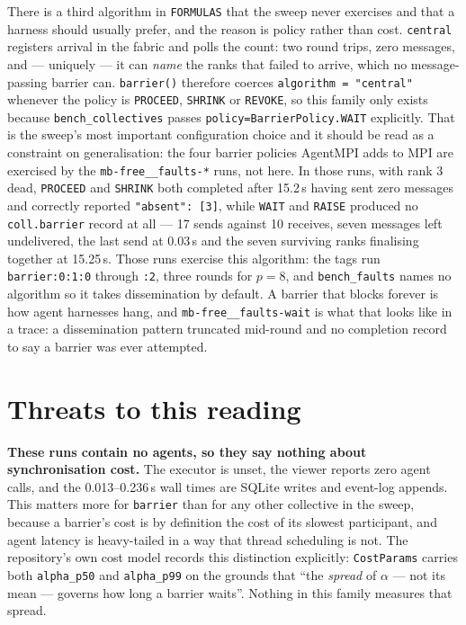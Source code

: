 \documentclass[11pt]{article}
\begin{document}
There is a third algorithm in \texttt{FORMULAS} that the sweep never exercises and that a
harness should usually prefer, and the reason is policy rather than cost. \texttt{central}
registers arrival in the fabric and polls the count: two round trips, zero messages, and ---
uniquely --- it can \emph{name} the ranks that failed to arrive, which no message-passing
barrier can. \texttt{barrier()} therefore coerces \texttt{algorithm = "central"} whenever the
policy is \texttt{PROCEED}, \texttt{SHRINK} or \texttt{REVOKE}, so this family only exists
because \texttt{bench\_collectives} passes \texttt{policy=BarrierPolicy.WAIT} explicitly. That
is the sweep's most important configuration choice and it should be read as a constraint on
generalisation: the four barrier policies AgentMPI adds to MPI are exercised by the
\texttt{mb-free\_\_faults-*} runs, not here. In those runs, with rank 3 dead, \texttt{PROCEED}
and \texttt{SHRINK} both completed after 15.2\,s having sent zero messages and correctly
reported \texttt{"absent": [3]}, while \texttt{WAIT} and \texttt{RAISE} produced no
\texttt{coll.barrier} record at all --- 17 sends against 10 receives, seven messages left
undelivered, the last send at 0.03\,s and the seven surviving ranks finalising together at
15.25\,s. Those runs exercise this algorithm: the tags run \texttt{barrier:0:1:0} through
\texttt{:2}, three rounds for $p=8$, and \texttt{bench\_faults} names no algorithm so it takes
dissemination by default. A barrier that blocks forever is how agent harnesses hang, and
\texttt{mb-free\_\_faults-wait} is what that looks like in a trace: a dissemination pattern
truncated mid-round and no completion record to say a barrier was ever attempted.

\section{Threats to this reading}

\textbf{These runs contain no agents, so they say nothing about synchronisation cost.} The
executor is unset, the viewer reports zero agent calls, and the 0.013--0.236\,s wall times are
SQLite writes and event-log appends. This matters more for \texttt{barrier} than for any other
collective in the sweep, because a barrier's cost is by definition the cost of its slowest
participant, and agent latency is heavy-tailed in a way that thread scheduling is not. The
repository's own cost model records this distinction explicitly: \texttt{CostParams} carries
both \texttt{alpha\_p50} and \texttt{alpha\_p99} on the grounds that ``the \emph{spread} of
$\alpha$ --- not its mean --- governs how long a barrier waits''. Nothing in this family
measures that spread.
\end{document}
